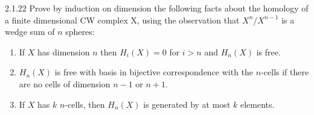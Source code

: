 \documentclass{article}
\begin{document}
\begin{exercise}{2.1.22}{\parindent}
  Prove by induction on dimension the following facts about the
  homology of a finite dimensional CW complex X, using the observation
  that $X^n/X^{n-1}$ is a wedge sum of $n$ spheres:
  \begin{enumerate}
  \item If $X$ has dimension $n$ then $H_i(X) = 0$ for $i > n$ and
    $H_n(X)$ is free.
  \item $H_n(X)$ is free with basis in bijective correspondence with
    the $n$-cells if there are no cells of dimension $n-1$ or $n+1$.
  \item If $X$ has $k$ $n$-cells, then $H_n(X)$ is generated by at most
    $k$ elements.
  \end{enumerate}
\end{exercise}
\end{document}
